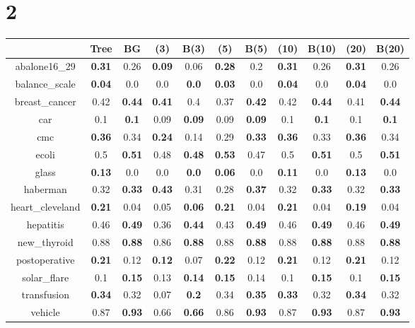 \documentclass{article}%
\begin{document}
\section*{2}%
\begin{tabular}{c|cccccccccc}%
\hline%
&Tree&BG&(3)&B(3)&(5)&B(5)&(10)&B(10)&(20)&B(20)\\%
\hline%
abalone16\_29&\textbf{0.31}&0.26&\textbf{0.09}&0.06&\textbf{0.28}&0.2&\textbf{0.31}&0.26&\textbf{0.31}&0.26\\%
\hline%
balance\_scale&\textbf{0.04}&0.0&0.0&\textbf{0.0}&\textbf{0.03}&0.0&\textbf{0.04}&0.0&\textbf{0.04}&0.0\\%
\hline%
breast\_cancer&0.42&\textbf{0.44}&\textbf{0.41}&0.4&0.37&\textbf{0.42}&0.42&\textbf{0.44}&0.41&\textbf{0.44}\\%
\hline%
car&0.1&\textbf{0.1}&0.09&\textbf{0.09}&0.09&\textbf{0.09}&0.1&\textbf{0.1}&0.1&\textbf{0.1}\\%
\hline%
cmc&\textbf{0.36}&0.34&\textbf{0.24}&0.14&0.29&\textbf{0.33}&\textbf{0.36}&0.33&\textbf{0.36}&0.34\\%
\hline%
ecoli&0.5&\textbf{0.51}&0.48&\textbf{0.48}&\textbf{0.53}&0.47&0.5&\textbf{0.51}&0.5&\textbf{0.51}\\%
\hline%
glass&\textbf{0.13}&0.0&0.0&\textbf{0.0}&\textbf{0.06}&0.0&\textbf{0.11}&0.0&\textbf{0.13}&0.0\\%
\hline%
haberman&0.32&\textbf{0.33}&\textbf{0.43}&0.31&0.28&\textbf{0.37}&0.32&\textbf{0.33}&0.32&\textbf{0.33}\\%
\hline%
heart\_cleveland&\textbf{0.21}&0.04&0.05&\textbf{0.06}&\textbf{0.21}&0.04&\textbf{0.21}&0.04&\textbf{0.19}&0.04\\%
\hline%
hepatitis&0.46&\textbf{0.49}&0.36&\textbf{0.44}&0.43&\textbf{0.49}&0.46&\textbf{0.49}&0.46&\textbf{0.49}\\%
\hline%
new\_thyroid&0.88&\textbf{0.88}&0.86&\textbf{0.88}&0.88&\textbf{0.88}&0.88&\textbf{0.88}&0.88&\textbf{0.88}\\%
\hline%
postoperative&\textbf{0.21}&0.12&\textbf{0.12}&0.07&\textbf{0.22}&0.12&\textbf{0.21}&0.12&\textbf{0.21}&0.12\\%
\hline%
solar\_flare&0.1&\textbf{0.15}&0.13&\textbf{0.14}&\textbf{0.15}&0.14&0.1&\textbf{0.15}&0.1&\textbf{0.15}\\%
\hline%
transfusion&\textbf{0.34}&0.32&0.07&\textbf{0.2}&0.34&\textbf{0.35}&\textbf{0.33}&0.32&\textbf{0.34}&0.32\\%
\hline%
vehicle&0.87&\textbf{0.93}&0.66&\textbf{0.66}&0.86&\textbf{0.93}&0.87&\textbf{0.93}&0.87&\textbf{0.93}\\%

\end{tabular}
\end{document}
